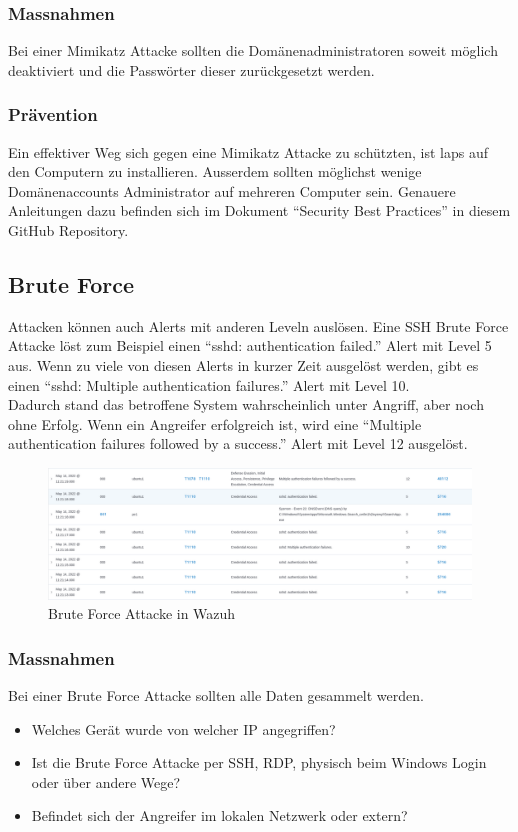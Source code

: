 \subsubsection{Massnahmen}
Bei einer Mimikatz Attacke sollten die Domänenadministratoren soweit möglich deaktiviert und die Passwörter dieser zurückgesetzt werden.

\subsubsection{Prävention}
Ein effektiver Weg sich gegen eine Mimikatz Attacke zu schützten, ist \acrshort{laps} auf den Computern zu installieren. 
Ausserdem sollten möglichst wenige Domänenaccounts Administrator auf mehreren Computer sein.
Genauere Anleitungen dazu befinden sich im Dokument ``Security Best Practices'' in diesem GitHub Repository.

\subsection{Brute Force}
Attacken können auch Alerts mit anderen Leveln auslösen. 
Eine SSH Brute Force Attacke löst zum Beispiel einen ``sshd: authentication failed.'' Alert mit Level 5 aus.
Wenn zu viele von diesen Alerts in kurzer Zeit ausgelöst werden, gibt es einen ``sshd: Multiple authentication failures.'' Alert mit Level 10.\\

Dadurch stand das betroffene System wahrscheinlich unter Angriff, aber noch ohne Erfolg.
Wenn ein Angreifer erfolgreich ist, wird eine ``Multiple authentication failures followed by a success.'' Alert mit Level 12 ausgelöst.
\begin{figure}[H]
    \centering
    \includegraphics[width=\linewidth]{../img/brute-force.png}
    \caption{Brute Force Attacke in Wazuh}
\end{figure}

\subsubsection{Massnahmen}
Bei einer Brute Force Attacke sollten alle Daten gesammelt werden.
\begin{itemize}
    \item Welches Gerät wurde von welcher IP angegriffen?
    \item Ist die Brute Force Attacke per SSH, RDP, physisch beim Windows Login oder über andere Wege? 
    \item Befindet sich der Angreifer im lokalen Netzwerk oder extern?
\end{itemize}

